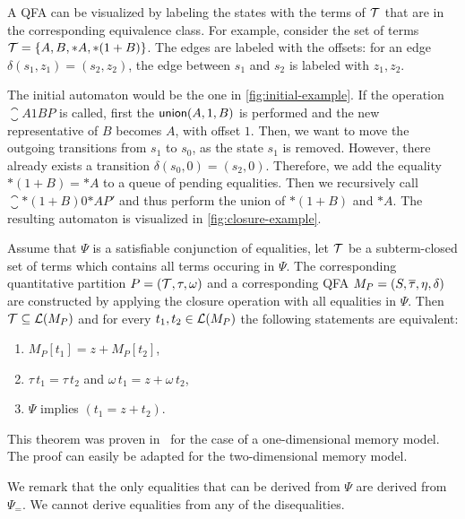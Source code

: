 \begin{example}
  A QFA can be visualized by labeling the states with the terms of $\mathcal{T}$ that are in the corresponding equivalence class.
  For example, consider the set of terms $\mathcal{T} = \{A, B, *A, *(1 + B)\}$.
  The edges are labeled with the offsets: for an edge $\delta(s_1, z_1) = (s_2, z_2)$, the edge between $s_1$ and $s_2$ is labeled with $z_1, z_2$.

  The initial automaton would be the one in \cref{fig:initial-example}.
  If the operation $\closure{A}{1}{B}{P}$ is called,
  first the $\textsf{union}(A, 1, B)$ is performed and the new representative of $B$ becomes $A$, with offset $1$.
  Then, we want to move the outgoing transitions from $s_1$ to $s_0$, as the state $s_1$ is removed.
  However, there already exists a transition $\delta(s_0,0) = (s_2, 0)$.
  Therefore, we add the equality $*(1 + B) = *A$ to a queue of pending equalities.
  Then we recursively call $\closure{*(1 + B)}{0}{*A}{P'}$ and thus perform the union of $*(1 + B)$ and $*A$.
  The resulting automaton is visualized in \cref{fig:closure-example}.
\end{example}

\begin{theorem}
  Assume that $\Psi$ is a satisfiable conjunction of equalities, let $\mathcal{T}$ be a subterm-closed set of terms which contains all terms occuring in $\Psi$.
  The corresponding quantitative partition $P = (\mathcal{T}, \tau,\omega)$ and a corresponding QFA $M_P = (S, \overline{\tau}, \eta, \delta)$ are constructed by applying the closure operation with all equalities in $\Psi$.
  Then $\mathcal{T} \subseteq \mathcal{L}(M_P)$ and for every $t_1, t_2 \in \mathcal{L}(M_P)$ the following statements are equivalent:
  \begin{enumerate}
    \item $M_P[t_1] = z + M_P[t_2]$,
    \item $\tau\,t_1 = \tau\,t_2$ and $\omega\,t_1 = z + \omega\,t_2$,
    \item $\Psi$ implies $(t_1 = z + t_2)$.
  \end{enumerate}
\end{theorem}

This theorem was proven in~\cite{2pointer} for the case of a one-dimensional memory model.
The proof can easily be adapted for the two-dimensional memory model.

We remark that the only equalities that can be derived from $\Psi$ are derived from $\Psi_=$. We cannot derive equalities from any of the disequalities.
